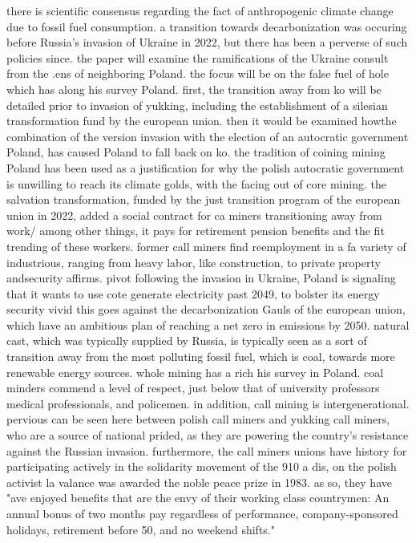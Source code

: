 \documentclass{article}
\begin{document}
there is scientific consensus regarding the fact of anthropogenic climate change due to fossil fuel consumption. a transition towards decarbonization was occuring before Russia's invasion of Ukraine in 2022, but there has been a perverse of such policies since. the paper will examine the ramifications of the Ukraine consult from the .ens of neighboring Poland. the focus will be on the false fuel of hole which has along his survey Poland. first, the transition away from ko will be detailed prior to invasion of yukking, including the establishment of a silesian transformation fund by the european union. then it would be examined howthe combination of the version invasion with the election of an autocratic government Poland, has caused Poland to fall back on ko. the tradition of coining mining Poland has been used as a justification for why the polish autocratic government is unwilling to reach its climate golds, with the facing out of core mining. 
the salvation transformation, funded by the just transition program of the european union in 2022, added a social contract for ca miners transitioning away from work/ among other things, it pays for retirement pension benefits and the fit trending of these workers. former call miners find reemployment in a fa variety of industrious, ranging from heavy labor, like construction, to private property andsecurity affirms.
pivot following the invasion in Ukraine, Poland is signaling that it wants to use cote generate electricity past 2049, to bolster its energy security vivid this goes against the decarbonization Gauls of the european union, which have an ambitious plan of reaching a net zero in emissions by 2050. natural cast, which was typically supplied by Russia, is typically seen as a sort of transition away from the most polluting fossil fuel, which is coal, towards more renewable energy sources.
whole mining has a rich his survey in Poland. coal minders commend a level of respect, just below that of university professors medical professionals, and policemen. in addition, call mining is intergenerational. pervious can be seen here between polish call miners and yukking call miners, who are a source of national prided, as they are powering the country's resistance against the Russian invasion. furthermore, the call miners unions have history for participating actively in the solidarity movement of the 910 a dis, on the polish activist la valance was awarded the noble peace prize in 1983. as so, they have "ave enjoyed benefits that are the envy of their working class countrymen: An annual bonus of two months pay regardless of performance, company-sponsored holidays, retirement before 50, and no weekend shifts."
\end{document}
